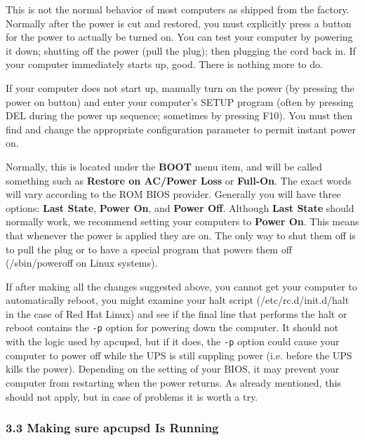 This is not the normal behavior of most computers as shipped from the factory.
Normally after the power is cut and restored, you must explicitly press a
button for the power to actually be turned on. You can test your computer by
powering it down; shutting off the power (pull the plug); then plugging the
cord back in. If your computer immediately starts up, good. There is nothing
more to do.  

If your computer does not start up, manually turn on the power (by pressing
the power on button) and enter your computer's SETUP program (often by
pressing DEL during the power up sequence; sometimes by pressing F10). You
must then find and change the appropriate configuration parameter to permit
instant power on.  

Normally, this is located under the {\bf BOOT} menu item, and will be called
something such as {\bf Restore on AC/Power Loss} or {\bf Full-On}. The exact
words will vary according to the ROM BIOS provider. Generally you will have
three options: {\bf Last State}, {\bf Power On}, and {\bf Power Off}. Although
{\bf Last State} should normally work, we recommend setting your computers to
{\bf Power On}. This means that whenever the power is applied they are on. The
only way to shut them off is to pull the plug or to have a special program
that powers them off (/sbin/poweroff on Linux systems).  

If after making all the changes suggested above, you cannot get your computer
to automatically reboot, you might examine your halt script
(/etc/rc.d/init.d/halt in the case of Red Hat Linux) and see if the final line
that performs the halt or reboot contains the {\tt -p} option for powering
down the computer. It should not with the logic used by apcupsd, but if it
does, the {\tt -p} option could cause your computer to power off while the UPS
is still suppling power (i.e. before the UPS kills the power).  Depending on
the setting of your BIOS, it may prevent your computer from restarting when
the power returns. As already mentioned, this should not apply, but in case of
problems it is worth a try. 

\label{Making-sure-apcupsd-Is-Running}

\subsubsection*{3.3 Making sure apcupsd Is Running}

